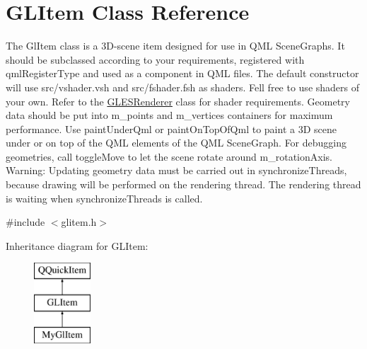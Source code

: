 \hypertarget{class_g_l_item}{}\section{G\+L\+Item Class Reference}
\label{class_g_l_item}


The Gl\+Item class is a 3D-\/scene item designed for use in Q\+ML Scene\+Graphs. It should be subclassed according to your requirements, registered with qml\+Register\+Type and used as a component in Q\+ML files. The default constructor will use src/vshader.\+vsh and src/fshader.\+fsh as shaders. Fell free to use shaders of your own. Refer to the \mbox{\hyperlink{class_g_l_e_s_renderer}{G\+L\+E\+S\+Renderer}} class for shader requirements. Geometry data should be put into m\+\_\+points and m\+\_\+vertices containers for maximum performance. Use paint\+Under\+Qml or paint\+On\+Top\+Of\+Qml to paint a 3D scene under or on top of the Q\+ML elements of the Q\+ML Scene\+Graph. For debugging geometries, call toggle\+Move to let the scene rotate around m\+\_\+rotation\+Axis. Warning\+: Updating geometry data must be carried out in synchronize\+Threads, because drawing will be performed on the rendering thread. The rendering thread is waiting when synchronize\+Threads is called.  




{\ttfamily \#include $<$glitem.\+h$>$}

Inheritance diagram for G\+L\+Item\+:\begin{figure}[H]
\begin{center}
\leavevmode
\includegraphics[height=3.000000cm]{class_g_l_item}
\end{center}
\end{figure}
